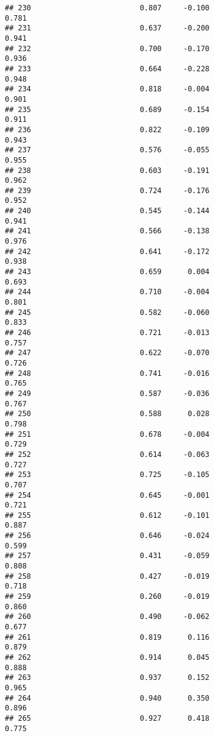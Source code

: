 \documentclass[
]{article}
\begin{document}
\begin{verbatim}
## 230                         0.807     -0.100                     0.781
## 231                         0.637     -0.200                     0.941
## 232                         0.700     -0.170                     0.936
## 233                         0.664     -0.228                     0.948
## 234                         0.818     -0.004                     0.901
## 235                         0.689     -0.154                     0.911
## 236                         0.822     -0.109                     0.943
## 237                         0.576     -0.055                     0.955
## 238                         0.603     -0.191                     0.962
## 239                         0.724     -0.176                     0.952
## 240                         0.545     -0.144                     0.941
## 241                         0.566     -0.138                     0.976
## 242                         0.641     -0.172                     0.938
## 243                         0.659      0.004                     0.693
## 244                         0.710     -0.004                     0.801
## 245                         0.582     -0.060                     0.833
## 246                         0.721     -0.013                     0.757
## 247                         0.622     -0.070                     0.726
## 248                         0.741     -0.016                     0.765
## 249                         0.587     -0.036                     0.767
## 250                         0.588      0.028                     0.798
## 251                         0.678     -0.004                     0.729
## 252                         0.614     -0.063                     0.727
## 253                         0.725     -0.105                     0.707
## 254                         0.645     -0.001                     0.721
## 255                         0.612     -0.101                     0.887
## 256                         0.646     -0.024                     0.599
## 257                         0.431     -0.059                     0.808
## 258                         0.427     -0.019                     0.718
## 259                         0.260     -0.019                     0.860
## 260                         0.490     -0.062                     0.677
## 261                         0.819      0.116                     0.879
## 262                         0.914      0.045                     0.888
## 263                         0.937      0.152                     0.965
## 264                         0.940      0.350                     0.896
## 265                         0.927      0.418                     0.775

\end{verbatim}
\end{document}
